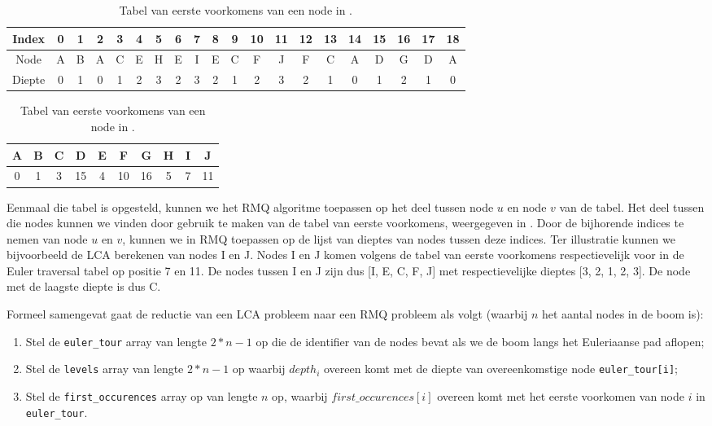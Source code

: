 \begin{table}
	\centering
	\caption{Tabulaire voorstelling van een Euler traversal door de boom uit 
	.}
	\label{tbl:euler}
   	\begin{tabular}{cccccccccccccccccccc}
       	\toprule
       	Index & 0 & 1 & 2 & 3 & 4 & 5 & 6 & 7 & 8 & 9 & 10 & 11 & 12 & 
       	13 & 14 & 15 & 16 & 17 & 18 \\ 
       	\midrule
       	Node   & A & B & A & C & E & H & E & I & E & C & F & J & F & C & A 
       	& D & G & D & A \\ 
       	Diepte & 0 & 1 & 0 & 1 & 2 & 3 & 2 & 3 & 2 & 1 & 2 & 3 & 2 & 1 & 
       	0 & 1 & 2 & 1 & 0 \\ 
       	\bottomrule
   	\end{tabular} 
   	\vspace{1cm}
   	\caption{Tabel van eerste voorkomens van een node in .}
   	\label{tbl:firstocc}
    \begin{tabular}{cccccccccc}
        \toprule
        A & B & C & D & E & F & G & H & I & J \\ 
        \midrule
        0 & 1 & 3 & 15 & 4 & 10 & 16 & 5 & 7 & 11  \\ 
        \bottomrule
    \end{tabular} 
\end{table}

Eenmaal die tabel is opgesteld, kunnen we het RMQ algoritme toepassen op het
deel tussen node $u$ en node $v$ van de tabel. Het deel tussen die nodes kunnen
we vinden door gebruik te maken van de tabel van eerste voorkomens, weergegeven
in . Door de bijhorende indices te nemen van node $u$ en $v$,
kunnen we in  RMQ toepassen op de lijst van dieptes van nodes
tussen deze indices. Ter illustratie kunnen we bijvoorbeeld de LCA berekenen van
nodes I en J. Nodes I en J komen volgens de tabel van eerste voorkomens
respectievelijk voor in de Euler traversal tabel op positie 7 en 11. De nodes
tussen I en J zijn dus [I, E, C, F, J] met respectievelijke dieptes [3, 2, 1, 2,
3]. De node met de laagste diepte is dus C.

Formeel samengevat gaat de reductie van een LCA probleem naar een RMQ probleem
als volgt (waarbij $n$ het aantal nodes in de boom is):

\begin{enumerate}
\item Stel de \texttt{euler\_tour} array van lengte $2*n-1$ op die de identifier
van de nodes bevat als we de boom langs het Euleriaanse pad aflopen;

\item Stel de \texttt{levels} array van lengte $2*n-1$ op waarbij $depth_i$
overeen komt met de diepte van overeenkomstige node \texttt{euler\_tour[i]};

\item Stel de \texttt{first\_occurences} array op van lengte $n$ op, waarbij
$first\_occurences[i]$ overeen komt met het eerste voorkomen van node $i$ in
\texttt{euler\_tour}.
\end{enumerate}

